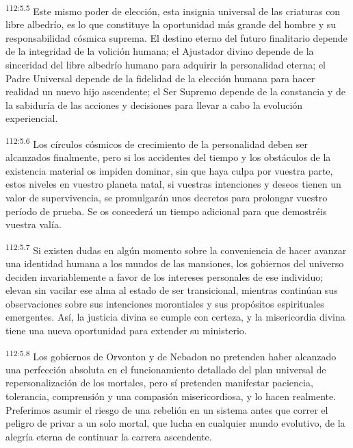 \par
\textsuperscript{112:5.5} Este mismo poder de elección, esta insignia universal de las criaturas con libre albedrío, es lo que constituye la oportunidad más grande del hombre y su responsabilidad cósmica suprema. El destino eterno del futuro finalitario depende de la integridad de la volición humana; el Ajustador divino depende de la sinceridad del libre albedrío humano para adquirir la personalidad eterna; el Padre Universal depende de la fidelidad de la elección humana para hacer realidad un nuevo hijo ascendente; el Ser Supremo depende de la constancia y de la sabiduría de las acciones y decisiones para llevar a cabo la evolución experiencial.

\par
\textsuperscript{112:5.6} Los círculos cósmicos de crecimiento de la personalidad deben ser alcanzados finalmente, pero si los accidentes del tiempo y los obstáculos de la existencia material os impiden dominar, sin que haya culpa por vuestra parte, estos niveles en vuestro planeta natal, si vuestras intenciones y deseos tienen un valor de supervivencia, se promulgarán unos decretos para prolongar vuestro período de prueba. Se os concederá un tiempo adicional para que demostréis vuestra valía.

\par
\textsuperscript{112:5.7} Si existen dudas en algún momento sobre la conveniencia de hacer avanzar una identidad humana a los mundos de las mansiones, los gobiernos del universo deciden invariablemente a favor de los intereses personales de ese individuo; elevan sin vacilar ese alma al estado de ser transicional, mientras continúan sus observaciones sobre sus intenciones morontiales y sus propósitos espirituales emergentes. Así, la justicia divina se cumple con certeza, y la misericordia divina tiene una nueva oportunidad para extender su ministerio.

\par
\textsuperscript{112:5.8} Los gobiernos de Orvonton y de Nebadon no pretenden haber alcanzado una perfección absoluta en el funcionamiento detallado del plan universal de repersonalización de los mortales, pero sí pretenden manifestar paciencia, tolerancia, comprensión y una compasión misericordiosa, y lo hacen realmente. Preferimos asumir el riesgo de una rebelión en un sistema antes que correr el peligro de privar a un solo mortal, que lucha en cualquier mundo evolutivo, de la alegría eterna de continuar la carrera ascendente.

